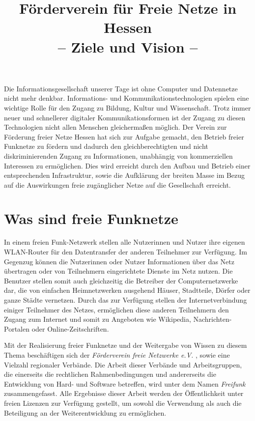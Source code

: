 \documentclass[ngerman]{article}
\title{Förderverein für Freie Netze in Hessen\\
-- Ziele und Vision --}
\begin{document}
\parindent 0pt
\parskip 10pt

\maketitle

Die Informationsgesellschaft unserer Tage ist ohne Computer und Datennetze nicht mehr denkbar.
In\-for\-ma\-tions- und Kommunikationstechnologien spielen eine wichtige Rolle für den Zugang zu Bildung, Kultur und Wissenschaft.
Trotz immer neuer und schnellerer digitaler Kommunikationsformen ist der Zugang zu diesen Technologien nicht allen Menschen gleichermaßen möglich.
Der Verein zur Förderung freier Netze Hessen hat sich zur Aufgabe gemacht, den Betrieb freier Funknetze zu fördern und dadurch den gleichberechtigten und nicht diskriminierenden Zugang zu Informationen, unabhängig von kommerziellen Interessen zu ermöglichen.
Dies wird erreicht durch den Aufbau und Betrieb einer entsprechenden Infrastruktur, sowie die Aufklärung der breiten Masse im Bezug auf die Auswirkungen freie zugänglicher Netze auf die Gesellschaft erreicht.


\section*{Was sind freie Funknetze}

In einem freien Funk-Netzwerk stellen alle Nutzerinnen und Nutzer ihre eigenen WLAN-Router für den Datentransfer der anderen Teilnehmer zur Verfügung.
Im Gegenzug können die Nutzerinnen oder Nutzer Informationen über das Netz übertragen oder von Teilnehmern eingerichtete Dienste im Netz nutzen.
Die Benutzer stellen somit auch gleichzeitig die Betreiber der Computernetzwerke dar, die von einfachen Heimnetzwerken ausgehend Häuser, Stadtteile, Dörfer oder ganze Städte vernetzen.
Durch das zur Verfügung stellen der Internetverbindung einiger Teilnehmer des Netzes, ermöglichen diese anderen Teilnehmern den Zugang zum Internet und somit zu Angeboten wie Wikipedia, Nachrichten-Portalen oder Online-Zeitschriften.

Mit der Realisierung freier Funknetze und der Weitergabe von Wissen zu diesem Thema beschäftigen sich der \textit{Förderverein freie Netzwerke e.V.} \cite{foerderverein}, sowie eine Vielzahl regionaler Verbände.
Die Arbeit dieser Verbände und Arbeitsgruppen, die einerseits die rechtlichen Rahmenbedingungen und andererseits die Entwicklung von Hard- und Software betreffen, wird unter dem Namen \textit{Freifunk} \cite{freifunk} zusammengefasst.
Alle Ergebnisse dieser Arbeit werden der Öffentlichkeit unter freien Lizenzen zur Verfügung gestellt, um sowohl die Verwendung als auch die Beteiligung an der Weiterentwicklung zu ermöglichen. 
\end{document}
